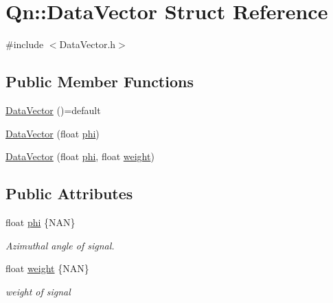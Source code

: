 \hypertarget{structQn_1_1DataVector}{}\section{Qn\+:\+:Data\+Vector Struct Reference}
\label{structQn_1_1DataVector}


{\ttfamily \#include $<$Data\+Vector.\+h$>$}

\subsection*{Public Member Functions}
\begin{DoxyCompactItemize}
\item 
\mbox{\hyperlink{structQn_1_1DataVector_a84d4d8bae550f4a73bf08fbb63912872}{Data\+Vector}} ()=default
\item 
\mbox{\hyperlink{structQn_1_1DataVector_a2b64b793e5e060ff50fdce74f87e1be9}{Data\+Vector}} (float \mbox{\hyperlink{structQn_1_1DataVector_a9307aef2f072b03cbabf61f76cff8f05}{phi}})
\item 
\mbox{\hyperlink{structQn_1_1DataVector_a41d789d2340f18aebfa6e2256c7a7f13}{Data\+Vector}} (float \mbox{\hyperlink{structQn_1_1DataVector_a9307aef2f072b03cbabf61f76cff8f05}{phi}}, float \mbox{\hyperlink{structQn_1_1DataVector_aed8109ed5183ca56982037b8d6c4f076}{weight}})
\end{DoxyCompactItemize}
\subsection*{Public Attributes}
\begin{DoxyCompactItemize}
\item 
\mbox{\label{structQn_1_1DataVector_a9307aef2f072b03cbabf61f76cff8f05}} 
float \mbox{\hyperlink{structQn_1_1DataVector_a9307aef2f072b03cbabf61f76cff8f05}{phi}} \{N\+AN\}
\begin{DoxyCompactList}\small\item\em Azimuthal angle of signal. \end{DoxyCompactList}\item 
\mbox{\label{structQn_1_1DataVector_aed8109ed5183ca56982037b8d6c4f076}} 
float \mbox{\hyperlink{structQn_1_1DataVector_aed8109ed5183ca56982037b8d6c4f076}{weight}} \{N\+AN\}
\begin{DoxyCompactList}\small\item\em weight of signal \end{DoxyCompactList}\end{DoxyCompactItemize}


